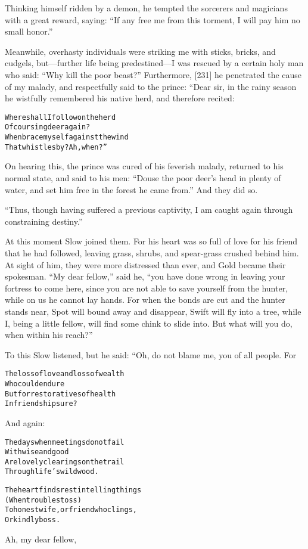 \documentclass{article}
\renewenvironment{verbatim}{\begin{alltt}\normalfont\begin{centering}}{\end{centering}\end{alltt}}
\begin{document}
Thinking himself ridden by a demon, he tempted the sorcerers and
magicians with a great reward, saying:
``If any free me from this torment, I will pay him no small honor.''

Meanwhile, overhasty individuals were striking me with sticks,
bricks, and cudgels, but---further life being predestined---I was
rescued by a certain holy man who said:
``Why kill the poor beast?'' Furthermore, [231] he penetrated the
cause of my malady, and respectfully said to the prince: “Dear sir,
in the rainy season he wistfully remembered his native herd, and
therefore recited:

\begin{verbatim}
Where shall I follow on the herd
    Of coursing deer again?
When brace myself against the wind
    That whistles by? Ah, when?”
\end{verbatim}
On hearing this, the prince was cured of his feverish malady,
returned to his normal state, and said to his men:
``Douse the poor deer's head in plenty of water, and set him free in the forest he came from.''
And they did so.

``Thus, though having suffered a previous captivity, I am caught again through constraining destiny.''

At this moment Slow joined them. For his heart was so full of love
for his friend that he had followed, leaving grass, shrubs, and
spear-grass crushed behind him. At sight of him, they were more
distressed than ever, and Gold became their spokesman.
``My dear fellow,'' said he,
``you have done wrong in leaving your fortress to come here, since you are not able to save yourself from the hunter, while on us he cannot lay hands. For when the bonds are cut and the hunter stands near, Spot will bound away and disappear, Swift will fly into a tree, while I, being a little fellow, will find some chink to slide into. But what will you do, when within his reach?''

To this Slow listened, but he said: “Oh, do not blame me, you of
all people. For

\begin{verbatim}
The loss of love and loss of wealth
    Who could endure
But for restoratives of health
    In friendship sure?
\end{verbatim}
And again:

\begin{verbatim}
The days when meetings do not fail
    With wise and good
Are lovely clearings on the trail
    Through life's wild wood.

The heart finds rest in telling things
    (When troubles toss)
To honest wife, or friend who clings,
    Or kindly boss.
\end{verbatim}
Ah, my dear fellow,
\end{document}
